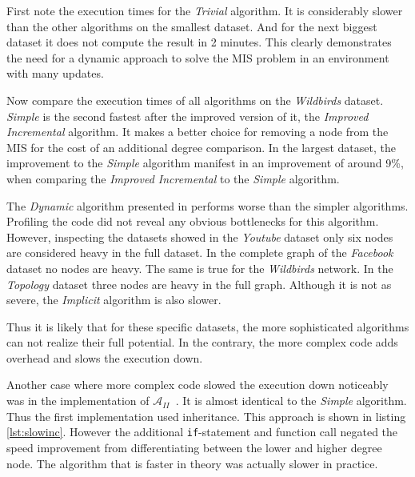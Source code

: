 \documentclass[letterpaper,11pt]{article}
\newcommand{\improvedinc}{$\mathcal{A}_{II}$\ }
\begin{document}
First note the execution times for the \textit{Trivial} algorithm. It is
considerably slower than the other algorithms on the smallest dataset. And for
the next biggest dataset it does not compute the result in 2 minutes. This
clearly demonstrates the need for a dynamic approach to solve the MIS problem in
an environment with many updates.

Now compare the execution times of all algorithms on the \textit{Wildbirds}
dataset. \textit{Simple} is the second fastest after the improved version of it,
the \textit{Improved Incremental} algorithm. It makes a better choice for
removing a node from the MIS for the cost of an additional degree comparison. In
the largest dataset, the improvement to the \textit{Simple} algorithm manifest
in an improvement of around 9\%, when comparing the \textit{Improved
Incremental} to the \textit{Simple} algorithm.

The \textit{Dynamic} algorithm presented in \cite{gupta2018simple} performs
worse than the simpler algorithms. Profiling the code did not reveal any obvious
bottlenecks for this algorithm. However, inspecting the datasets showed in
the \textit{Youtube} dataset only six nodes are considered heavy in the full
dataset. In the complete graph of the \textit{Facebook} dataset no nodes are
heavy. The same is true for the \textit{Wildbirds} network. In the
\textit{Topology} dataset three nodes are heavy in the full graph. Although it
is not as severe, the \textit{Implicit} algorithm is also slower.

Thus it is likely that for these specific datasets, the more sophisticated
algorithms can not realize their full potential. In the contrary, the more
complex code adds overhead and slows the execution down.




Another case where more complex code slowed the execution down noticeably was in the
implementation of \improvedinc. It is almost identical to the \textit{Simple}
algorithm. Thus the first implementation used inheritance. This approach is
shown in listing \ref{lst:slowinc}. However the additional
\lstinline[]{if}-statement and function call negated the speed improvement from
differentiating between the lower and higher degree node. The algorithm that is
faster in theory was actually slower in practice.
\end{document}
